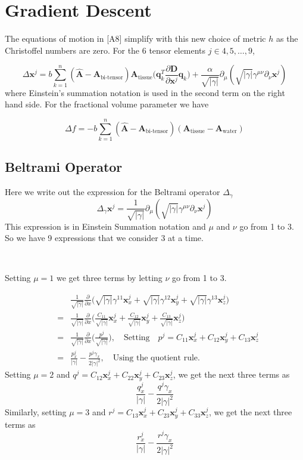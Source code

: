 \documentclass[12pt]{article}
\newcommand{\vect}[1]{\mathbf{#1}}
\newcommand{\detgam}{|\gamma|}
\newcommand{\sqdetgam}{\sqrt{|\gamma|}}
\newcommand{\Ahat}{\hat{\vect{A}}}
\newcommand{\Atissue}{\vect{A}_{\text{tissue}}}
\newcommand{\Awater}{\vect{A}_{\text{water}}}
\newcommand{\Abitensor}{\vect{A}_{\text{bi-tensor}}}
\newcommand{\vx}{\vect{x}}
\newcommand{\pp}[1]{\frac{\partial}{\partial #1}}
\begin{document}
\section{Gradient Descent}
The equations of motion in \cite{Pasternak2009}[A8] simplify with this new
choice of metric $h$ as the Christoffel numbers are zero. For the 6 tensor
elements $j \in {4, 5, \ldots, 9}$, 

$$\Delta\vect{x}^j = b\sum_{k=1}^n (\Ahat - \Abitensor) \Atissue
\bigg(\vect{q}_k^T\frac{\partial\vect{D}}{\partial\vx^j}\vect{q}_k\bigg) +
\frac{\alpha}{\sqdetgam} \partial_\mu (\sqdetgam \gamma^{\mu \nu} \partial_\nu 
\vx^j)
$$
where Einstein's summation notation is used in the second term on the right
hand side. For the fractional volume parameter we have

$$\Delta f = -b \sum_{k=1}^n (\Ahat - \Abitensor)(\Atissue - \Awater)$$

\subsection{Beltrami Operator}
Here we write out the expression for the Beltrami operator $\Delta_\gamma$
$$\Delta_\gamma \vx^j = \frac{1}{\sqdetgam} \partial_\mu 
    (\sqdetgam \gamma^{\mu \nu} \partial_\nu \vx^j)$$
This expression is in Einstein Summation notation and $\mu$ and $\nu$ go
from 1 to 3. So we have 9 expressions that we consider 3 at a time. 

\ 

\noindent
Setting $\mu = 1$ we get three terms by letting $\nu$ go from 1 to 3.

\begin{eqnarray*}
& &\frac{1}{\sqdetgam} \frac{\partial}{\partial x}
\big(\sqdetgam \gamma^{11} \vx^j_x + 
 \sqdetgam \gamma^{12} \vx^j_y +
 \sqdetgam \gamma^{13} \vx^j_z\big) \\
&=&\frac{1}{\sqdetgam} \frac{\partial}{\partial x}
\bigg(\frac{C_{11}}{\sqdetgam} \vx^j_x + 
      \frac{C_{12}}{\sqdetgam} \vx^j_y +
      \frac{C_{13}}{\sqdetgam} \vx^j_z \bigg) \\
&=& \frac{1}{\sqdetgam} \pp{x} \bigg( \frac{p^j}{\sqdetgam} \bigg), 
      \quad\text{Setting}\quad 
      p^j = C_{11}\vx^j_x + C_{12}\vx^j_y + C_{13}\vx^j_z\\
&=& \frac{p^j_x}{\detgam} - \frac{p^j \gamma_x}{2\detgam^2}, 
      \quad\text{Using the quotient rule.}
\end{eqnarray*}
\noindent 
Setting $\mu = 2$ and $q^j = C_{12}\vx^j_x + C_{22}\vx^j_y + C_{23}\vx^j_z$, we get the next three terms as
$$ \frac{q^j_x}{\detgam} - \frac{q^j \gamma_x}{2\detgam^2}$$
\noindent 
Similarly, setting $\mu = 3$ and $r^j = C_{13}\vx^j_x + C_{23}\vx^j_y + C_{33}\vx^j_z$, we get the next three terms as
$$ \frac{r^j_x}{\detgam} - \frac{r^j \gamma_x}{2\detgam^2}$$
\end{document}
